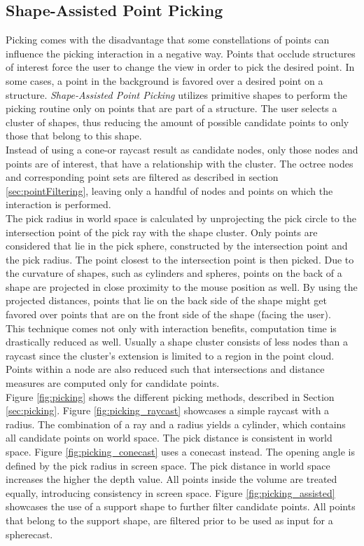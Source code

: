 \subsection{Shape-Assisted Point Picking}
\label {picking_assisted}
Picking comes with the disadvantage that some constellations of points can influence the picking interaction in a negative way. Points that occlude structures of interest force the user to change the view in order to pick the desired point. In some cases, a point in the background is favored over a desired point on a structure. 
\textit{Shape-Assisted Point Picking} utilizes primitive shapes to perform the picking routine only on points that are part of a structure. The user selects a cluster of shapes, thus reducing the amount of possible candidate points to only those that belong to this shape. 
\\ 
Instead of using a cone-or raycast result as candidate nodes, only those nodes and points are of interest, that have a relationship with the cluster. The octree nodes and corresponding point sets are filtered as described in section \ref{sec:pointFiltering}, leaving only a handful of nodes and points on which the interaction is performed. 
\\
The pick radius in world space is calculated by unprojecting the pick circle to the intersection point of the pick ray with the shape cluster. Only points are considered that lie in the pick sphere, constructed by the intersection point and the pick radius. The point closest to the intersection point is then picked. Due to the curvature of shapes, such as cylinders and spheres, points on the back of a shape are projected in close proximity to the mouse position as well. By using the projected distances, points that lie on the back side of the shape might get favored over points that are on the front side of the shape (facing the user). 
\\
This technique comes not only with interaction benefits, computation time is drastically reduced as well. Usually a shape cluster consists of less nodes than a raycast since the cluster's extension is limited to a region in the point cloud. Points within a node are also reduced such that intersections and distance measures are computed only for candidate points. 
\\

Figure \ref{fig:picking} shows the different picking methods, described in Section \ref{sec:picking}. Figure \ref{fig:picking_raycast} showcases a simple raycast with a radius. The combination of a ray and a radius yields a cylinder, which contains all candidate points on world space. The pick distance is consistent in world space. Figure \ref{fig:picking_conecast} uses a conecast instead. The opening angle is defined by the pick radius in screen space. The pick distance in world space increases the higher the depth value. All points inside the volume are treated equally, introducing consistency in screen space. Figure \ref{fig:picking_assisted} showcases the use of a support shape to further filter candidate points. All points that belong to the support shape, are filtered prior to be used as input for a spherecast. 

